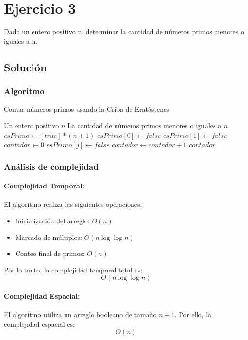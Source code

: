 \section{Ejercicio 3}
Dado un entero positivo n, determinar la cantidad de números primos menores o iguales a n.

\subsection*{Solución}
\subsubsection*{Algoritmo}
\begin{algorithm}[H]
\caption{Contar números primos usando la Criba de Eratóstenes}
\begin{algorithmic}[1]
\REQUIRE Un entero positivo $n$
\ENSURE La cantidad de números primos menores o iguales a $n$
\STATE $esPrimo \gets [true] * (n+1)$ 
\STATE $esPrimo[0] \gets false$
\STATE $esPrimo[1] \gets false$
\STATE $contador \gets 0$
            \STATE $esPrimo[j] \gets false$
        \ENDFOR
    \ENDIF
\ENDFOR
{}
        \STATE $contador \gets contador + 1$
    \ENDIF
\ENDFOR
\RETURN $contador$
\end{algorithmic}
\end{algorithm}

\subsubsection*{Análisis de complejidad}
\paragraph{Complejidad Temporal:}
El algoritmo realiza las siguientes operaciones:
\begin{itemize}
    \item Inicialización del arreglo: $O(n)$
    \item Marcado de múltiplos: $O(n \log \log n)$
    \item Conteo final de primos: $O(n)$
\end{itemize}
Por lo tanto, la complejidad temporal total es:
\[
O(n \log \log n)
\]

\paragraph{Complejidad Espacial:}
El algoritmo utiliza un arreglo booleano de tamaño $n+1$. Por ello, la complejidad espacial es:
\[
O(n)
\] 